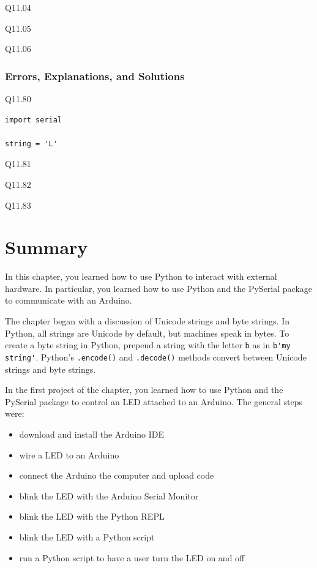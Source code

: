 \documentclass{book}
\providecommand{\tightlist}{%
      \setlength{\itemsep}{0pt}\setlength{\parskip}{0pt}}
\begin{document}
Q11.04

Q11.05

Q11.06

\subsubsection{Errors, Explanations, and
Solutions}\label{errors-explanations-and-solutions}

Q11.80

\begin{lstlisting}
import serial

string = 'L'
\end{lstlisting}

Q11.81

Q11.82

Q11.83
    




    
        \section{Summary}\label{summary}
    




    
        In this chapter, you learned how to use Python to interact with external
hardware. In particular, you learned how to use Python and the PySerial
package to communicate with an Arduino.

The chapter began with a discussion of Unicode strings and byte strings.
In Python, all strings are Unicode by default, but machines speak in
bytes. To create a byte string in Python, prepend a string with the
letter \lstinline!b! as in \lstinline!b'my string'!. Python's
\lstinline!.encode()! and \lstinline!.decode()! methods convert between
Unicode strings and byte strings.

In the first project of the chapter, you learned how to use Python and
the PySerial package to control an LED attached to an Arduino. The
general steps were:

\begin{itemize}
\tightlist
\item
  download and install the Arduino IDE
\item
  wire a LED to an Arduino
\item
  connect the Arduino the computer and upload code
\item
  blink the LED with the Arduino Serial Monitor
\item
  blink the LED with the Python REPL
\item
  blink the LED with a Python script
\item
  run a Python script to have a user turn the LED on and off
\end{itemize}
\end{document}
